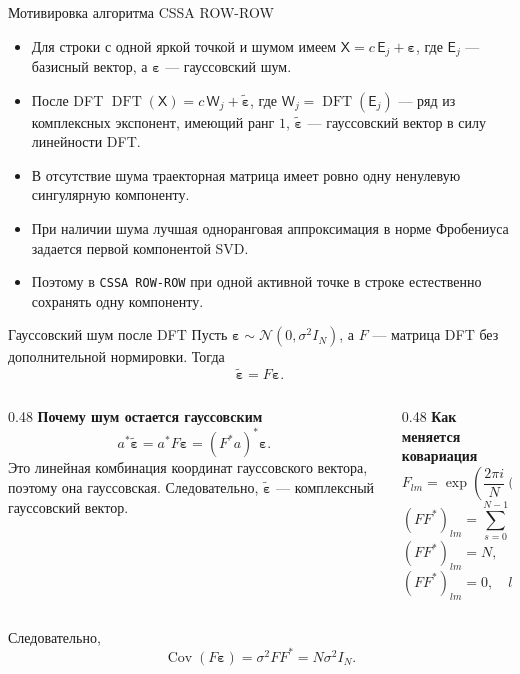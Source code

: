 \documentclass[unicode,notheorems]{beamer}
\begin{document}
\begin{frame}{Мотивировка алгоритма CSSA ROW-ROW}
	\small
	\begin{itemize}
		\item Для строки с одной яркой точкой и шумом имеем
		$\mathsf{X} = c\,\mathsf{E}_j + \boldsymbol{\varepsilon}$,
		где $\mathsf{E}_j$ --- базисный вектор, а $\boldsymbol{\varepsilon}$ --- гауссовский шум.
		\item После DFT
		$\operatorname{DFT}(\mathsf{X}) = c\,\mathsf{W}_j + \widetilde{\boldsymbol{\varepsilon}}$,
		где $\mathsf{W}_j=\operatorname{DFT}(\mathsf{E}_j)$ --- ряд из комплексных экспонент, имеющий ранг $1$, $\widetilde{\boldsymbol{\varepsilon}}$ --- гауссовский вектор в силу линейности DFT.
		\item В отсутствие шума траекторная матрица имеет ровно одну ненулевую сингулярную компоненту.
		\item При наличии шума лучшая одноранговая аппроксимация в норме Фробениуса задается первой компонентой SVD.
		\item Поэтому в \texttt{CSSA ROW-ROW} при одной активной точке в строке естественно сохранять одну компоненту.
	\end{itemize}
\end{frame}

\begin{frame}{Гауссовский шум после DFT}
	\scriptsize
	Пусть $\boldsymbol{\varepsilon}\sim \mathcal N(0,\sigma^2 I_N)$, а $F$ --- матрица DFT без дополнительной нормировки. Тогда
	\[
		\widetilde{\boldsymbol{\varepsilon}} = F\boldsymbol{\varepsilon}.
	\]

	\vspace{-0.2cm}
	\begin{columns}[T]
		\begin{column}{0.48\textwidth}
			\textbf{Почему шум остается гауссовским}
			\[
				a^{*}\widetilde{\boldsymbol{\varepsilon}}
				= a^{*}F\boldsymbol{\varepsilon}
				= (F^{*}a)^{*}\boldsymbol{\varepsilon}.
			\]
			Это линейная комбинация координат гауссовского вектора, поэтому она гауссовская. Следовательно, $\widetilde{\boldsymbol{\varepsilon}}$ --- комплексный гауссовский вектор.
		\end{column}
		\begin{column}{0.48\textwidth}
			\textbf{Как меняется ковариация}
			\[
				F_{lm}=\exp\!\left(\frac{2\pi i}{N}(l-1)(m-1)\right),
			\]
				\[
					(FF^{*})_{lm}=
					\sum_{s=0}^{N-1}
					\exp\!\left(\frac{2\pi i}{N}s(l-m)\right).
				\]
			\[
				(FF^{*})_{lm}=N,\quad l=m,
			\]
			\vspace{-0.35cm}
			\[
				(FF^{*})_{lm}=0,\quad l\ne m.
			\]
		\end{column}
	\end{columns}

	\vspace{0.05cm}
	Следовательно,
	\[
		\operatorname{Cov}(F\boldsymbol{\varepsilon})=\sigma^2 FF^{*}=N\sigma^2 I_N.
	\]
\end{frame}
\end{document}
